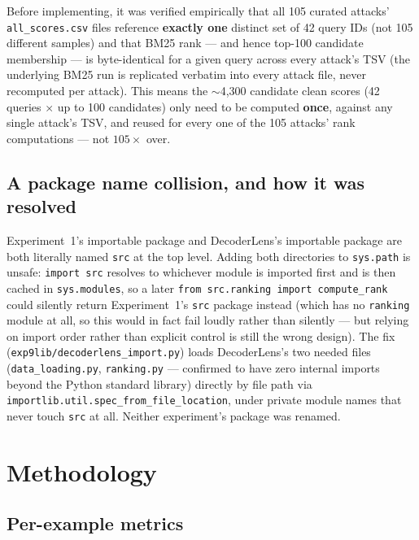 \documentclass[11pt]{article}
\begin{document}
Before implementing, it was verified empirically that all 105 curated
attacks' \texttt{all\_scores.csv} files reference \textbf{exactly one}
distinct set of 42 query IDs (not 105 different samples) and that BM25 rank
--- and hence top-100 candidate membership --- is byte-identical for a
given query across every attack's TSV (the underlying BM25 run is
replicated verbatim into every attack file, never recomputed per attack).
This means the $\sim$4{,}300 candidate clean scores (42 queries $\times$ up
to 100 candidates) only need to be computed \textbf{once}, against any
single attack's TSV, and reused for every one of the 105 attacks' rank
computations --- not $105\times$ over.

\subsection{A package name collision, and how it was resolved}

Experiment~1's importable package and DecoderLens's importable package are
both literally named \texttt{src} at the top level. Adding both
directories to \texttt{sys.path} is unsafe: \texttt{import src} resolves to
whichever module is imported first and is then cached in
\texttt{sys.modules}, so a later \texttt{from src.ranking import
compute\_rank} could silently return Experiment~1's \texttt{src} package
instead (which has no \texttt{ranking} module at all, so this would in fact
fail loudly rather than silently --- but relying on import order rather
than explicit control is still the wrong design). The fix
(\texttt{exp9lib/decoderlens\_import.py}) loads DecoderLens's two needed
files (\texttt{data\_loading.py}, \texttt{ranking.py} --- confirmed to have
zero internal imports beyond the Python standard library) directly by file
path via \texttt{importlib.util.spec\_from\_file\_location}, under private
module names that never touch \texttt{src} at all. Neither experiment's
package was renamed.

\section{Methodology}

\subsection{Per-example metrics}
\end{document}
